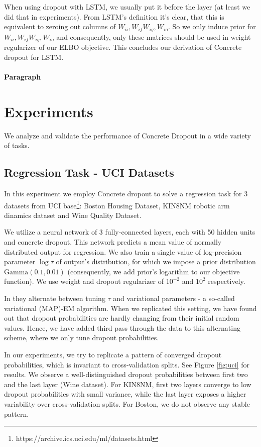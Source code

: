 \documentclass{article}
\begin{document}
When using dropout with LSTM, we usually put it before the layer (at least we did that in experiments). From LSTM's definition it's clear, that this is equivalent to zeroing out columns of $W_{ii}, W_{if} W_{ig}, W_{io}$. So we only induce prior for $W_{ii}, W_{if} W_{ig}, W_{io}$ and consequently, only these matrices should be used in weight regularizer of our ELBO objective. This concludes our derivation of Concrete dropout for LSTM.

\paragraph{Paragraph} 


\section{Experiments}
\label{sec:experiments}

We analyze and validate the performance of Concrete Dropout in a wide variety of tasks. 

\subsection{Regression Task - UCI Datasets}

In this experiment we employ Concrete dropout to solve a regression task for 3 datasets from UCI base\footnote{https://archive.ics.uci.edu/ml/datasets.html}: Boston Housing Dataset, KIN8NM robotic arm dinamics dataset and Wine Quality Dataset.

We utilize a neural network of 3 fully-connected layers, each with 50 hidden units and concrete dropout. This network predicts a mean value of normally distributed output for regression. We also train a single value of log-precision parameter $\log \tau$ of output's distribution, for which we impose a prior distribution $\text{Gamma}(0.1, 0.01)$ (consequently, we add prior's logarithm to our objective function). We use weight and dropout regularizer of $10^{-2}$ and $10^2$ respectively.

In \cite{concrete} they alternate between tuning $\tau$ and variational parameters - a so-called variational (MAP)-EM algorithm. When we replicated this setting, we have found out that dropout probabilities are hardly changing from their initial random values. Hence, we have added third pass through the data to this alternating scheme, where we only tune dropout probabilities.

In our experiments, we try to replicate a pattern of converged dropout probabilities, which is invariant to cross-validation splits. See Figure \ref{fig:uci} for results. We observe a well-distinguished dropout probabilities between first two and the last layer (Wine dataset). For KIN8NM, first two layers converge to low dropout probabilities with small variance, while the last layer exposes a higher variability over cross-validation splits. For Boston, we do not observe any stable pattern.
\end{document}
